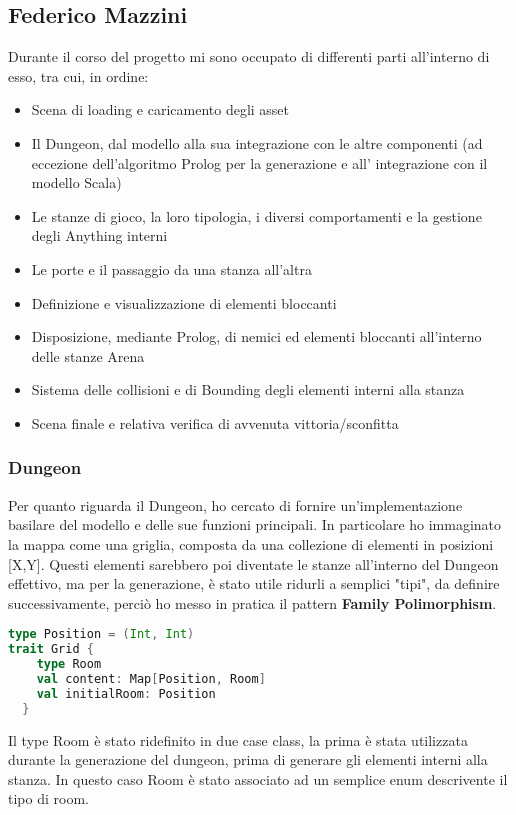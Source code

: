 \subsection{Federico Mazzini}
Durante il corso del progetto mi sono occupato di differenti parti all'interno di esso, tra cui, in ordine:
\begin{itemize}
    \item Scena di loading e caricamento degli asset
    \item Il Dungeon, dal modello alla sua integrazione con le altre componenti (ad eccezione dell'algoritmo Prolog per la generazione e all' integrazione con il modello Scala)
    \item Le stanze di gioco, la loro tipologia, i diversi comportamenti e la gestione degli Anything interni
    \item Le porte e il passaggio da una stanza all'altra
    \item Definizione e visualizzazione di elementi bloccanti
    \item Disposizione, mediante Prolog, di nemici ed elementi bloccanti all'interno delle stanze Arena
    \item Sistema delle collisioni e di Bounding degli elementi interni alla stanza
    \item Scena finale e relativa verifica di avvenuta vittoria/sconfitta
\end{itemize}

\subsubsection{Dungeon}
Per quanto riguarda il Dungeon, ho cercato di fornire un'implementazione basilare del modello e delle sue funzioni principali. 
In particolare ho immaginato la mappa come una griglia, composta da una collezione di elementi in posizioni [X,Y]. Questi elementi sarebbero poi diventate le stanze all'interno del Dungeon effettivo, 
ma per la generazione, è stato utile ridurli a semplici "tipi", da definire successivamente, perciò ho messo in pratica il pattern \textbf{Family Polimorphism}.

\begin{lstlisting}[language=Scala]
type Position = (Int, Int)
trait Grid {
    type Room
    val content: Map[Position, Room]
    val initialRoom: Position
  }   
\end{lstlisting}
Il type Room è stato ridefinito in due case class, la prima è stata utilizzata durante la generazione del dungeon, prima di generare gli elementi interni alla stanza. 
In questo caso Room è stato associato ad un semplice enum descrivente il tipo di room. 


